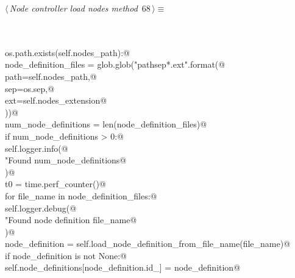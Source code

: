 \documentclass[
    a4paper,      %
    10pt,         %
    openright,    %
    notitlepage,  %
    parskip=half, %
]{scrreprt}       %
\theoremstyle{definition}                    %
\begin{document}
\begin{flushleft} \small
\begin{minipage}{\linewidth}\label{scrap114}\raggedright\small
{} $\langle\,${\itshape Node controller load nodes method}\nobreak\ {\footnotesize {68}}$\,\rangle\equiv$
\vspace{-1exm}
\begin{list}{}{} \item
\mbox{}\lstinline@@\\
\mbox{}\lstinline@@\\
\mbox{}\lstinline@if os.path.exists(self.nodes_path):@\\
\mbox{}\lstinline@    node_definition_files = glob.glob("{path}{sep}*.{ext}".format(@\\
\mbox{}\lstinline@        path=self.nodes_path,@\\
\mbox{}\lstinline@        sep=os.sep,@\\
\mbox{}\lstinline@        ext=self.nodes_extension@\\
\mbox{}\lstinline@    ))@\\
\mbox{}\lstinline@    num_node_definitions = len(node_definition_files)@\\
\mbox{}\lstinline@    if num_node_definitions > 0:@\\
\mbox{}\lstinline@        self.logger.info(@\\
\mbox{}\lstinline@            "Found %d node definition(s), loading.",@\\
\mbox{}\lstinline@            num_node_definitions@\\
\mbox{}\lstinline@        )@\\
\mbox{}\lstinline@        t0 = time.perf_counter()@\\
\mbox{}\lstinline@        for file_name in node_definition_files:@\\
\mbox{}\lstinline@            self.logger.debug(@\\
\mbox{}\lstinline@                "Found node definition %s, trying to load",@\\
\mbox{}\lstinline@                file_name@\\
\mbox{}\lstinline@            )@\\
\mbox{}\lstinline@            node_definition = self.load_node_definition_from_file_name(file_name)@\\
\mbox{}\lstinline@            if node_definition is not None:@\\
\mbox{}\lstinline@                self.node_definitions[node_definition.id_] = node_definition@\\

\end{list}
\end{minipage}
\end{flushleft}
\end{document}

